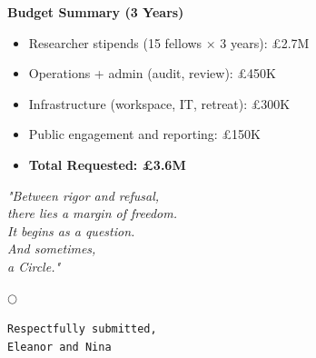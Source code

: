 \begin{tcolorbox}[colback=gray!5, colframe=black, boxrule=0.3mm, sharp corners, width=\dimexpr\linewidth+1cm\relax
, enlarge left by=0mm]
{\noindent\textbf{Budget Summary (3 Years)}

{\scriptsize
\begin{itemize}
  \setlength\itemsep{2pt}
  \setlength\parsep{0pt}
  \item Researcher stipends (15 fellows × 3 years): £2.7M
  \item Operations + admin (audit, review): £450K
  \item Infrastructure (workspace, IT, retreat): £300K
  \item Public engagement and reporting: £150K
  \item \textbf{Total Requested: £3.6M}
\end{itemize}
}

\centering
\textit{"Between rigor and refusal,\\
there lies a margin of freedom.\\
It begins as a question.\\
And sometimes,\\
a Circle."}

\vspace{1.5em}
\textbf{\LARGE $\bigcirc$}

\vspace{2em}
\begin{flushright}
\texttt{Respectfully submitted,}\\
\texttt{Eleanor and Nina}
\end{flushright}
}
\end{tcolorbox}

\newpage

